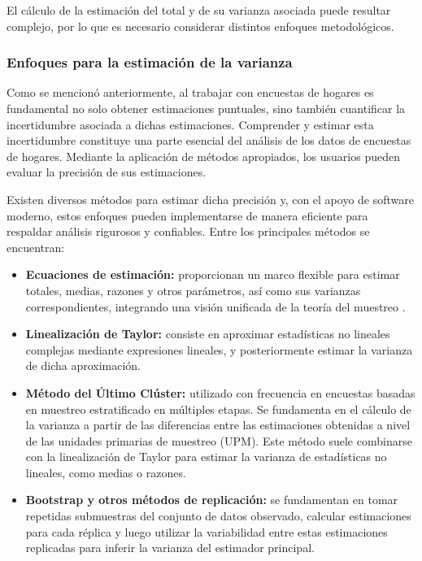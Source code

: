 \documentclass[
  spanish,
  12pt,
]{book}
\begin{document}
El cálculo de la estimación del total y de su varianza asociada puede resultar complejo, por lo que es necesario considerar distintos enfoques metodológicos.

\subsubsection{Enfoques para la estimación de la varianza}\label{enfoques-para-la-estimaciuxf3n-de-la-varianza}

Como se mencionó anteriormente, al trabajar con encuestas de hogares es fundamental no solo obtener estimaciones puntuales, sino también cuantificar la incertidumbre asociada a dichas estimaciones. Comprender y estimar esta incertidumbre constituye una parte esencial del análisis de los datos de encuestas de hogares. Mediante la aplicación de métodos apropiados, los usuarios pueden evaluar la precisión de sus estimaciones.

Existen diversos métodos para estimar dicha precisión y, con el apoyo de software moderno, estos enfoques pueden implementarse de manera eficiente para respaldar análisis rigurosos y confiables. Entre los principales métodos se encuentran:

\begin{itemize}
\item
  \textbf{Ecuaciones de estimación:} proporcionan un marco flexible para estimar totales, medias, razones y otros parámetros, así como sus varianzas correspondientes, integrando una visión unificada de la teoría del muestreo \citep{binder1983variances}.
\item
  \textbf{Linealización de Taylor:} consiste en aproximar estadísticas no lineales complejas mediante expresiones lineales, y posteriormente estimar la varianza de dicha aproximación.
\item
  \textbf{Método del Último Clúster:} utilizado con frecuencia en encuestas basadas en muestreo estratificado en múltiples etapas. Se fundamenta en el cálculo de la varianza a partir de las diferencias entre las estimaciones obtenidas a nivel de las unidades primarias de muestreo (UPM). Este método suele combinarse con la linealización de Taylor para estimar la varianza de estadísticas no lineales, como medias o razones.
\item
  \textbf{Bootstrap y otros métodos de replicación:} se fundamentan en tomar repetidas submuestras del conjunto de datos observado, calcular estimaciones para cada réplica y luego utilizar la variabilidad entre estas estimaciones replicadas para inferir la varianza del estimador principal.
\end{itemize}
\end{document}
